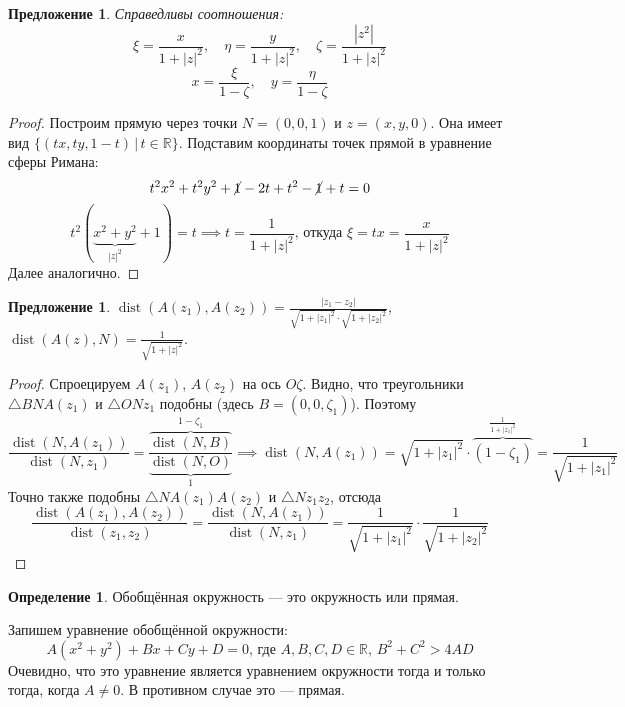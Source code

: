 \documentclass[11pt,openany,a4paper]{scrartcl}
\theoremstyle{plain}
\newtheorem{proposition}[theorem]{Предложение}
\theoremstyle{definition}
\newtheorem{definition}[theorem]{Определение}
\newcommand\mb{\mathbb}
\newcommand\real{\mb R}
\DeclareMathOperator{\dist}{dist}
\begin{document}
\begin{proposition}
	Справедливы соотношения:
	$$
	\xi = \frac{x}{1 + |z|^2},\quad\eta = \frac{y}{1 + |z|^2},\quad\zeta = \frac{|z^2|}{1 + |z|^2}
	$$
	$$
	x = \frac{\xi}{1 - \zeta},\quad y = \frac{\eta}{1 - \zeta}
	$$
\end{proposition}
\begin{proof}
	Построим прямую через точки $N = (0, 0, 1)$ и $z = (x, y, 0)$. Она имеет вид
	$\{(tx, ty, 1-t)\,|\, t \in \real\}$. Подставим координаты точек прямой в уравнение сферы Римана:
	$$
	t^2x^2 + t^2y^2 + \cancel{1} - 2t + t^2 - \cancel{1} + t = 0
	$$
	$$
	t^2(\underbrace{x^2 + y^2}_{|z|^2} + 1) = t \implies t = \frac{1}{1 + |z|^2} \text{, откуда } \xi = tx =
	\frac{x}{1 + |z|^2}
	$$
	Далее аналогично.
\end{proof}
\begin{proposition}
	$\dist(A(z_1), A(z_2)) = \frac{|z_1 - z_2|}{\sqrt{1 + |z_1|^2} \cdot \sqrt{1 + |z_2|^2}}$,
	$\dist(A(z), N) = \frac{1}{\sqrt{1 + |z|^2}}$.
\end{proposition}
\begin{proof}
	Спроецируем $A(z_1)$, $A(z_2)$ на ось $O\zeta$. Видно, что треугольники $\triangle BNA(z_1)$ и $\triangle ONz_1$
	подобны (здесь $B = (0, 0, \zeta_1)$). Поэтому
	$$
	\frac{\dist(N, A(z_1))}{\dist(N, z_1)} = \frac{\overbrace{\dist(N, B)}^{1 - \zeta_1}}{\underbrace{\dist(N, O)}_1}
	\implies \dist(N, A(z_1)) = \sqrt{1 + |z_1|^2} \cdot \overbrace{(1 - \zeta_1)}^{\frac{1}{1 + |z_1|^2}} =
	\frac{1}{\sqrt{1 + |z_1|^2}}
	$$
	Точно также подобны $\triangle NA(z_1)A(z_2)$ и $\triangle Nz_1z_2$, отсюда
	$$
	\frac{\dist(A(z_1), A(z_2))}{\dist(z_1, z_2)} = \frac{\dist(N, A(z_1))}{\dist(N, z_1)} = \frac{1}{\sqrt{1 +|z_1|^2}}
	\cdot \frac{1}{\sqrt{1 + |z_2|^2}}
	$$
\end{proof}

\begin{definition}
	Обобщённая окружность — это окружность или прямая.
\end{definition}

Запишем уравнение обобщённой окружности:
$$
A(x^2 + y^2) + Bx + Cy + D = 0 \text{, где } A, B, C, D \in \real,\, B^2 + C^2 > 4AD
$$
Очевидно, что это уравнение является уравнением окружности тогда и только тогда, когда $A \neq 0$. В противном случае это —
прямая.
\end{document}
